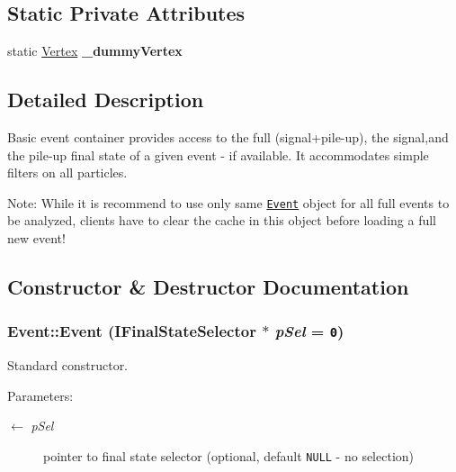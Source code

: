 \subsection*{Static Private Attributes}
\begin{CompactItemize}
\item 
\hypertarget{classEvent_d00f1f7a5e9b6ad652c85f28dbd08be0}{
static \hyperlink{classVertex}{Vertex} \textbf{\_\-dummy\-Vertex}}
\label{classEvent_d00f1f7a5e9b6ad652c85f28dbd08be0}

\end{CompactItemize}


\subsection{Detailed Description}
Basic event container provides access to the full (signal+pile-up), the signal,and the pile-up final state of a given event - if available. It accommodates simple filters on all particles.

\begin{Desc}
\item[Note:]While it is recommend to use only same {\tt \hyperlink{classEvent}{Event}} object for all full events to be analyzed, clients have to clear the cache in this object before loading a full new event! \end{Desc}




\subsection{Constructor \& Destructor Documentation}
\hypertarget{classEvent_cf4f8ae50e55e8f5a270e5029c0eb58d}{
\subsubsection[Event]{\setlength{\rightskip}{0pt plus 5cm}Event::Event (IFinal\-State\-Selector $\ast$ {\em p\-Sel} = {\tt 0})}}
\label{classEvent_cf4f8ae50e55e8f5a270e5029c0eb58d}


Standard constructor. 

\begin{Desc}
\item[Parameters:]
\begin{description}
\item[\mbox{$\leftarrow$} {\em p\-Sel}]pointer to final state selector (optional, default {\tt NULL} - no selection) \end{description}
\end{Desc}


